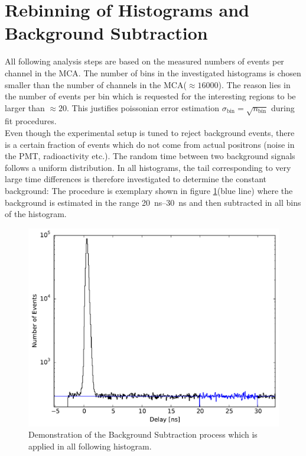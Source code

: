 \documentclass[
	paper=A4,
	parskip=full,
	chapterprefix=true,
	11pt,
	headings=normal,
	bibliography=totoc,
	listof=totoc,
	titlepage=on,
]{scrreprt}
\begin{document}
\section{Rebinning of Histograms and Background Subtraction}
All following analysis steps are based on the measured numbers of events per channel in the MCA. The number of bins in the investigated histograms is chosen smaller than the number of channels in the MCA($\approx 16000$). The reason lies in the number of events per bin which is requested for the interesting regions to be larger than $\approx 20$. This justifies poissonian error estimation $\sigma_\textrm{bin}=\sqrt{n_\textrm{bin}}$ during fit procedures. \\

Even though the experimental setup is tuned to reject background events, there is a certain fraction of events which do not come from actual positrons (noise in the PMT, radioactivity etc.). The random time between two background signals follows a uniform distribution. In all histograms, the tail corresponding to very large time differences is therefore investigated to determine the constant background: The procedure is exemplary shown in figure \ref{fig:resolution_background}(blue line) where the background is estimated in the range \SIrange{20}{30}{\nano\second} and then subtracted in all bins of the histogram. 

\begin{figure}
	\centering
	\includegraphics{resolution_background}
	\caption{Demonstration of the Background Subtraction process which is applied in all following histogram.}
	\label{fig:resolution_background}
\end{figure}
\end{document}

